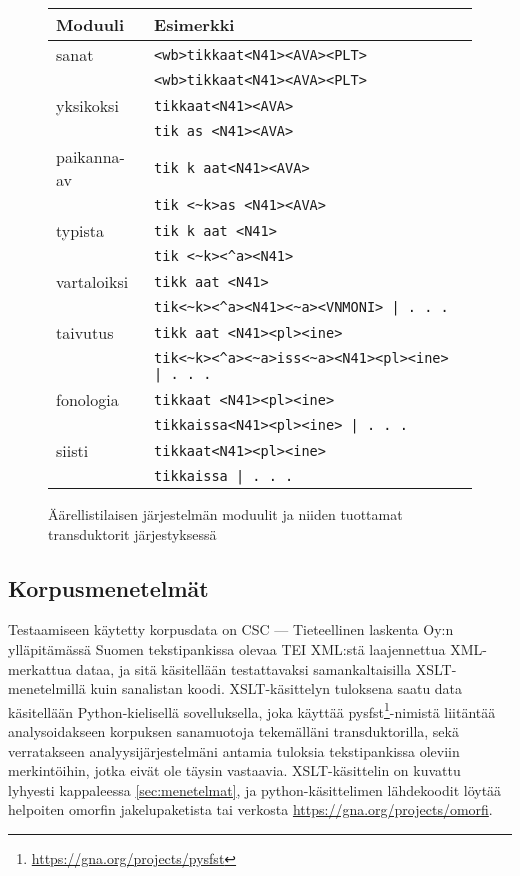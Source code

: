 \documentclass[free]{flammie}
\begin{document}
\begin{figure}
    \caption{Äärellistilaisen järjestelmän moduulit ja niiden tuottamat
    transduktorit
    järjestyksessä}
    \begin{tabular}{|l|l|}
        \hline
        \bf Moduuli & \bf Esimerkki \\
        \hline
        sanat & \verb|<wb>tikkaat<N41><AVA><PLT>| \\
        & \verb|<wb>tikkaat<N41><AVA><PLT>| \\
        \hline
        yksikoksi & \verb|tikkaat<N41><AVA>| \\
        & \verb|tik as <N41><AVA>| \\
        \hline
        paikanna-av & \verb|tik k aat<N41><AVA>| \\
        & \verb|tik <~k>as <N41><AVA>| \\
        \hline
        typista & \verb|tik k aat <N41>| \\
        & \verb|tik <~k><^a><N41>| \\
        \hline
        vartaloiksi & \verb|tikk aat <N41>| \\
        & \verb_tik<~k><^a><N41><~a><VNMONI> | . . ._ \\
        \hline
        taivutus & \verb|tikk aat <N41><pl><ine>| \\
        & \verb_tik<~k><^a><~a>iss<~a><N41><pl><ine> | . . ._ \\
        \hline
        fonologia & \verb|tikkaat <N41><pl><ine>| \\
        & \verb_tikkaissa<N41><pl><ine> | . . ._ \\
        \hline
        siisti & \verb_tikkaat<N41><pl><ine>_ \\
        & \verb_tikkaissa | . . ._ \\
        \hline
    \end{tabular}
\end{figure}


\subsection{Korpusmenetelmät} \label{subsec:koprus}

Testaamiseen käytetty korpusdata on CSC — Tieteellinen laskenta Oy:n
ylläpitämässä Suomen tekstipankissa olevaa TEI XML:stä laajennettua
XML-merkattua dataa, ja sitä käsitellään testattavaksi samankaltaisilla
XSLT-menetelmillä kuin sanalistan koodi. XSLT-käsittelyn tuloksena saatu data
käsitellään Python-kielisellä sovelluksella, joka käyttää
pysfst\footnote{\url{https://gna.org/projects/pysfst}}-nimistä liitäntää
analysoidakseen korpuksen sanamuotoja tekemälläni transduktorilla, sekä
verratakseen analyysijärjestelmäni antamia tuloksia tekstipankissa oleviin
merkintöihin, jotka eivät ole täysin vastaavia. XSLT-käsittelin on kuvattu
lyhyesti kappaleessa \ref{sec:menetelmat}, ja python-käsittelimen lähdekoodit löytää helpoiten
omorfin jakelupaketista tai verkosta \url{https://gna.org/projects/omorfi}.
\end{document}
